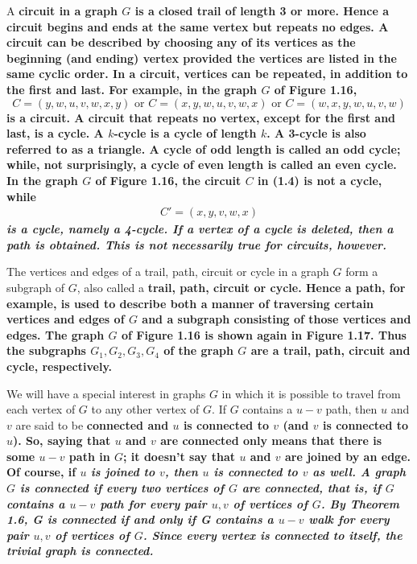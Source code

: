 A \bf{circuit} in a graph $G$ is a closed trail of length 3 or more. Hence a circuit begins and ends at the same vertex but repeats no edges. A circuit can be described by choosing any of its vertices as the beginning (and ending) vertex provided the vertices are listed in the same cyclic order. In a circuit, vertices can be repeated, in addition to the first and last. For example, in the graph $G$ of Figure 1.16,
\begin{equation}
C = (y,w,u,v,w,x,y) \text{ or } C = (x,y,w,u,v,w,x) \text{ or } C = (w,x,y,w,u,v,w)
\end{equation}
is a circuit. A circuit that repeats no vertex, except for the first and last, is a \bf{cycle}. A $k$\bf{-cycle} is a cycle of length $k$. A 3-cycle is also referred to as a \bf{triangle}. A cycle of odd length is called an \bf{odd cycle}; while, not surprisingly, a cycle of even length is called an \bf{even cycle}. In the graph $G$ of Figure 1.16, the circuit $C$ in (1.4) is not a cycle, while
\begin{align*}
C' = (x,y,v,w,x)
\end{align*}
\it{is} a cycle, namely a 4-cycle. If a vertex of a cycle is deleted, then a path is obtained. This is not necessarily true for circuits, however.

The vertices and edges of a trail, path, circuit or cycle in a graph $G$ form a subgraph of $G$, also called a \bf{trail}, \bf{path}, \bf{circuit} or \bf{cycle}. Hence a path, for example, is used to describe both a manner of traversing certain vertices and edges of $G$ and a subgraph consisting of those vertices and edges. The graph $G$ of Figure 1.16 is shown again in Figure 1.17. Thus the subgraphs $G_{1}, G_{2}, G_{3}, G_{4}$ of the graph $G$ are a trail, path, circuit and cycle, respectively.



We will have a special interest in graphs $G$ in which it is possible to travel from each vertex of $G$ to any other vertex of $G$. If $G$ contains a $u-v$ path, then $u$ and $v$ are said to be \bf{connected} and $u$ \bf{is connected to} $v$ (and $v$ is connected to $u$). So, saying that $u$ and $v$ are connected only means that there is some $u-v$ path in $G$; it doesn't say that $u$ and $v$ are joined by an edge. Of course, if $u$ \it{is} joined to $v$, then $u$ is connected to $v$ as well. A graph $G$ is \bf{connected} if every two vertices of $G$ are connected, that is, if $G$ contains a $u-v$ path for every pair $u,v$ of vertices of $G$. By Theorem 1.6, G is connected if and only if G contains a $u-v$ walk for every pair $u,v$ of vertices of $G$. Since every vertex is connected to itself, the trivial graph is connected.

